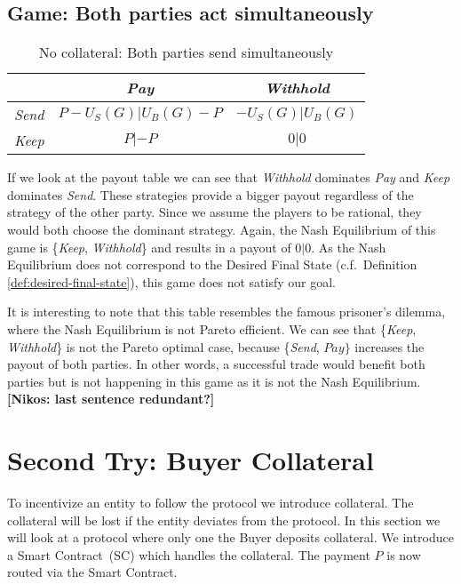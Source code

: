 \documentclass{cacthesis}
\newcommand{\authnote}[3]{{ \footnotesize \textbf{#1[#2: #3]~}}}
\newcommand{\orfnote}[1]{\authnote{\color{blue}}{Orfeas}{#1}}
\newcommand{\niknote}[1]{\authnote{\color{red}}{Nikos}{#1}}
\begin{document}
\subsection{Game: Both parties act simultaneously} 

\begin{table}[htb!]
    \centering
    \begin{tabular}{ c||c|c| }
    & \emph{Pay} & \emph{Withhold}  \\
    \hline
    \hline
    \emph{Send} & $P - U_S(G)|U_B(G) - P$ & $-U_S(G) | U_B(G)$ \\
    \hline
    \emph{Keep} & $P |-P$ & $0 | 0$ \\ 
    \hline
    \end{tabular}
    \label{fig:nocol-simultaneous}
    \caption{No collateral: Both parties send simultaneously}
\end{table}
If we look at the payout table we can see that \emph{Withhold} dominates \emph{Pay} and \emph{Keep} dominates \emph{Send}. These strategies provide a bigger payout regardless of the strategy of the other party.
Since we assume the players to be rational, they would both choose the dominant strategy.
Again, the Nash Equilibrium of this game is \{\emph{Keep}, \emph{Withhold}\} and results in a payout of $0|0$. As the Nash Equilibrium does not correspond to the Desired Final State (c.f.~Definition \ref{def:desired-final-state}), this game does not satisfy our goal.\newline

It is interesting to note that this table resembles the famous prisoner's dilemma, where the Nash Equilibrium is not Pareto efficient. We can see that \{\emph{Keep}, \emph{Withhold}\} is not the Pareto optimal case, because \{\emph{Send}, $Pay\}$ increases the payout of both parties. 
In other words, a successful trade would benefit both parties but is not happening in this game as it is not the Nash Equilibrium. \niknote{last sentence redundant?}



\section{Second Try: Buyer Collateral}
\label{sec:buyer-collateral}
To incentivize an entity to follow the protocol we introduce collateral. The collateral will be lost if the entity deviates from the protocol. In this section we will look at a protocol where only one the Buyer deposits collateral. We introduce a Smart Contract~(SC) which handles the collateral. The payment $P$ is now routed via the Smart Contract.  \newline
\end{document}
